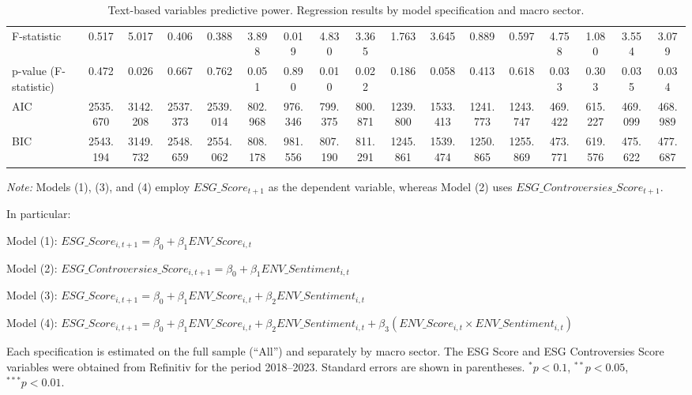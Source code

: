 \begin{landscape}
\begin{table}[ht]
{\begin{tabular}{lcccccccccccccccc}
F-statistic & 0.517 & 5.017 & 0.406 & 0.388 & 3.898 & 0.019 & 4.830 & 3.365 & 1.763 & 3.645 & 0.889 & 0.597 & 4.758 & 1.080 & 3.554 & 3.079 \\
p-value (F-statistic) & 0.472 & 0.026 & 0.667 & 0.762 & 0.051 & 0.890 & 0.010 & 0.022 & 0.186 & 0.058 & 0.413 & 0.618 & 0.033 & 0.303 & 0.035 & 0.034 \\
AIC & 2535.670 & 3142.208 & 2537.373 & 2539.014 & 802.968 & 976.346 & 799.375 & 800.871 & 1239.800 & 1533.413 & 1241.773 & 1243.747 & 469.422 & 615.227 & 469.099 & 468.989 \\
BIC & 2543.194 & 3149.732 & 2548.659 & 2554.062 & 808.178 & 981.556 & 807.190 & 811.291 & 1245.861 & 1539.474 & 1250.865 & 1255.869 & 473.771 & 619.576 & 475.622 & 477.687 \\
\bottomrule
\end{tabular}
} %
\caption{Text-based variables predictive power. Regression results by model specification and macro sector.}
\vspace{2ex}
\begin{minipage}{\linewidth}
\footnotesize
\textit{Note:} Models (1), (3), and (4) employ $ESG\_Score_{t+1}$ as the dependent variable, whereas Model (2) uses $ESG\_Controversies\_Score_{t+1}$.\vspace*{0.5ex} \par In particular:\vspace*{0.5ex} \par Model (1): $ESG\_Score_{i,t+1} = \beta_0 + \beta_1ENV\_Score_{i,t} $\vspace*{0.5ex} \par Model (2): $ESG\_Controversies\_Score_{i,t+1} = \beta_0 + \beta_1ENV\_Sentiment_{i,t} $\vspace*{0.5ex} \par Model (3): $ESG\_Score_{i,t+1} = \beta_0 + \beta_1ENV\_Score_{i,t} + \beta_2ENV\_Sentiment_{i,t} $\vspace*{0.5ex} \par Model (4): $ESG\_Score_{i,t+1} = \beta_0 + \beta_1ENV\_Score_{i,t} + \beta_2ENV\_Sentiment_{i,t} + \beta_3(ENV\_Score_{i,t}\times ENV\_Sentiment_{i,t} )$\vspace*{1ex} \par Each specification is estimated on the full sample (“All”) and separately by macro sector. The ESG Score and ESG Controversies Score variables were obtained from Refinitiv for the period 2018–2023. Standard errors are shown in parentheses. $^{*}p<0.1$, $^{**}p<0.05$, $^{***}p<0.01$.
\end{minipage}
\label{tab:all_models}
\end{table}
\end{landscape}
